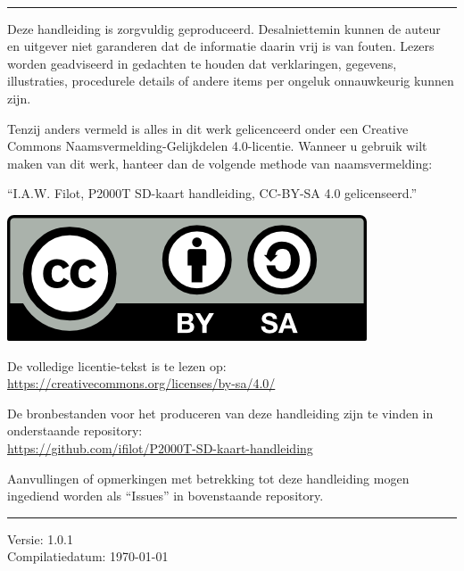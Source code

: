 ~\vfill

\begin{minipage}{1.0\textwidth}

\thispagestyle{empty}
\setlength{\parindent}{0pt}
\setlength{\parskip}{\baselineskip}

\noindent\rule{1.0\textwidth}{0.4pt}

Deze handleiding is zorgvuldig geproduceerd. Desalniettemin kunnen de auteur en uitgever niet garanderen dat de informatie daarin vrij is van fouten. Lezers worden geadviseerd in gedachten te houden dat verklaringen, gegevens, illustraties, procedurele details of andere items per ongeluk onnauwkeurig kunnen zijn.

Tenzij anders vermeld is alles in dit werk gelicenceerd onder een Creative Commons Naamsvermelding-Gelijkdelen 4.0-licentie. Wanneer u gebruik wilt maken van dit werk, hanteer dan de volgende methode van naamsvermelding:

``I.A.W. Filot, P2000T SD-kaart handleiding, CC-BY-SA 4.0 gelicenseerd.'' 

\includegraphics[]{img/by-sa.png}

De volledige licentie-tekst is te lezen op:\\
\url{https://creativecommons.org/licenses/by-sa/4.0/}

De bronbestanden voor het produceren van deze handleiding zijn te vinden in onderstaande repository:\\
\faGithub\;\url{https://github.com/ifilot/P2000T-SD-kaart-handleiding}

Aanvullingen of opmerkingen met betrekking tot deze handleiding mogen ingediend worden als ``Issues'' in bovenstaande repository.

\noindent\rule{1.0\textwidth}{0.4pt}
Versie: 1.0.1\\
Compilatiedatum: \today

\end{minipage}
